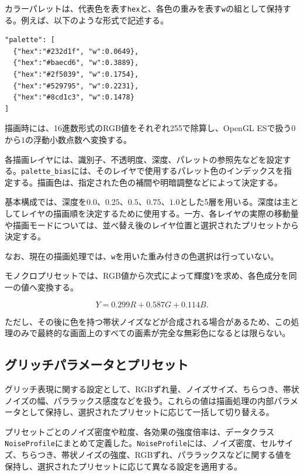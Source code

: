 カラーパレットは、代表色を表す\texttt{hex}と、各色の重みを表す\texttt{w}の組として保持する。例えば、以下のような形式で記述する。

\begin{verbatim}
"palette": [
  {"hex":"#232d1f", "w":0.0649},
  {"hex":"#baecd6", "w":0.3889},
  {"hex":"#2f5039", "w":0.1754},
  {"hex":"#529795", "w":0.2231},
  {"hex":"#8cd1c3", "w":0.1478}
]
\end{verbatim}

描画時には、16進数形式のRGB値をそれぞれ255で除算し、OpenGL ESで扱う$0$から$1$の浮動小数点数へ変換する。

各描画レイヤには、識別子、不透明度、深度、パレットの参照先などを設定する。\texttt{palette\_bias}には、そのレイヤで使用するパレット色のインデックスを指定する。描画色は、指定された色の補間や明暗調整などによって決定する。

基本構成では、深度を$0.0$、$0.25$、$0.5$、$0.75$、$1.0$とした5層を用いる。深度は主としてレイヤの描画順を決定するために使用する。一方、各レイヤの実際の移動量や描画モードについては、並べ替え後のレイヤ位置と選択されたプリセットから決定する。

なお、現在の描画処理では、\texttt{w}を用いた重み付きの色選択は行っていない。

モノクロプリセットでは、RGB値から次式によって輝度$Y$を求め、各色成分を同一の値へ変換する。

\begin{equation}
Y=0.299R+0.587G+0.114B.
\end{equation}

ただし、その後に色を持つ帯状ノイズなどが合成される場合があるため、この処理のみで最終的な画面上のすべての画素が完全な無彩色になるとは限らない。


\subsection{グリッチパラメータとプリセット}

グリッチ表現に関する設定として、RGBずれ量、ノイズサイズ、ちらつき、帯状ノイズの幅、パララックス感度などを扱う。これらの値は描画処理の内部パラメータとして保持し、選択されたプリセットに応じて一括して切り替える。

プリセットごとのノイズ密度や粒度、各効果の強度倍率は、データクラス\texttt{NoiseProfile}にまとめて定義した。\texttt{NoiseProfile}には、ノイズ密度、セルサイズ、ちらつき、帯状ノイズの強度、RGBずれ、パララックスなどに関する値を保持し、選択されたプリセットに応じて異なる設定を適用する。

